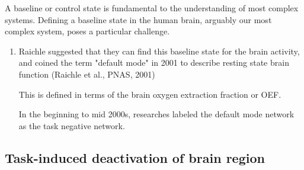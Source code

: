 \begin{enumerate}


  


\end{enumerate}

A baseline or control state is fundamental to the understanding of most complex
systems. Defining a baseline state in the human brain, arguably our most complex
system, poses a particular challenge.
\begin{enumerate}
  
    \item Raichle suggested that they can find this baseline state for the brain
    activity, and coined the term "default mode" in 2001 to describe resting
    state brain function (Raichle et al., PNAS, 2001)
    
    This is defined in terms of the brain oxygen extraction fraction or OEF.
    


In the beginning to mid 2000s, researches labeled the default mode network as the task negative network. 


  
\end{enumerate}

\subsection{Task-induced deactivation of brain region}

